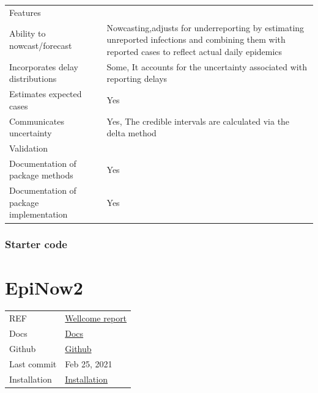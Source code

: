 \documentclass[
  letterpaper,
  DIV=11,
  numbers=noendperiod]{scrreprt}
\begin{document}
\begin{longtable}[]{@{}
  >{\raggedright\arraybackslash}p{}
  >{\raggedright\arraybackslash}p{}@{}}
\toprule\noalign{}
\endhead
\bottomrule\noalign{}
\endlastfoot
Features & \\
Ability to nowcast/forecast & Nowcasting,adjusts for underreporting by
estimating unreported infections and combining them with reported cases
to reflect actual daily epidemics \\
Incorporates delay distributions & Some, It accounts for the uncertainty
associated with reporting delays \\
Estimates expected cases & Yes \\
Communicates uncertainty & Yes, The credible intervals are calculated
via the delta method \\
Validation & \\
Documentation of package methods & Yes \\
Documentation of package implementation & Yes \\
\end{longtable}

\subsection*{Starter code}\label{starter-code}

\chapter*{EpiNow2}\label{epinow2}


\begin{longtable}[]{@{}
  >{\raggedright\arraybackslash}p{}
  >{\raggedright\arraybackslash}p{}@{}}
\toprule\noalign{}
\endhead
\bottomrule\noalign{}
\endlastfoot
REF & \href{https://wellcomeopenresearch.org/articles/5-112}{Wellcome
report} \\
Docs & \href{https://epiforecasts.io/EpiNow2/}{Docs} \\
Github & \href{https://github.com/epiforecasts/EpiNow2}{Github} \\
Last commit & Feb 25, 2021 \\
Installation &
\href{https://cran.r-project.org/web/packages/EpiNow2/index.html}{Installation} \\
\end{longtable}
\end{document}
